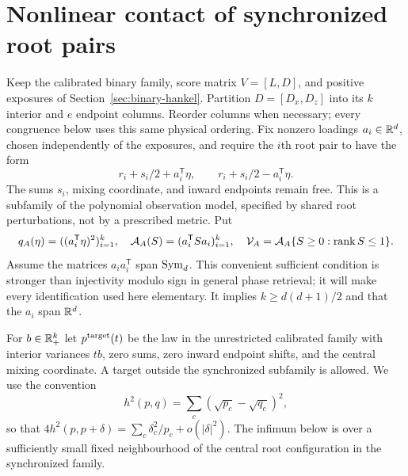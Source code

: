 \section{Nonlinear contact of synchronized root pairs}\label{sec:synchronized}
Keep the calibrated binary family, score matrix $V=[L,D]$, and positive exposures of Section~\ref{sec:binary-hankel}. Partition $D=[D_x,D_z]$ into its $k$ interior and $e$ endpoint columns. Reorder columns when necessary; every congruence below uses this same physical ordering. Fix nonzero loadings $a_i\in\mathbb R^d$, chosen independently of the exposures, and require the $i$th root pair to have the form
\begin{equation}\label{eq:synchronized-roots}
 r_i+s_i/2+a_i^{\mathsf T}\eta,\qquad
 r_i+s_i/2-a_i^{\mathsf T}\eta.
\end{equation}
The sums $s_i$, mixing coordinate, and inward endpoints remain free. This is a subfamily of the polynomial observation model, specified by shared root perturbations, not by a prescribed metric. Put
\[
 q_A(\eta)=((a_i^{\mathsf T}\eta)^2)_{i=1}^k,
 \quad \mathcal A_A(S)=(a_i^{\mathsf T}Sa_i)_{i=1}^k,
 \quad \mathcal V_A=\mathcal A_A\{S\ge0:\operatorname{rank} S\le1\}.
\]
Assume the matrices $a_i a_i^{\mathsf T}$ span $\operatorname{Sym}_d$. This convenient sufficient condition is stronger than injectivity modulo sign in general phase retrieval; it will make every identification used here elementary. It implies $k\ge d(d+1)/2$ and that the $a_i$ span $\mathbb R^d$.

For $b\in\mathbb R_+^k$ let $p^{\rm target}(t)$ be the law in the unrestricted calibrated family with interior variances $tb$, zero sums, zero inward endpoint shifts, and the central mixing coordinate. A target outside the synchronized subfamily is allowed. We use the convention
\[
 h^2(p,q)=\sum_c(\sqrt{p_c}-\sqrt{q_c})^2,
\]
so that $4h^2(p,p+\delta)=\sum_c\delta_c^2/p_c+o(|\delta|^2)$. The infimum below is over a sufficiently small fixed neighbourhood of the central root configuration in the synchronized family.

